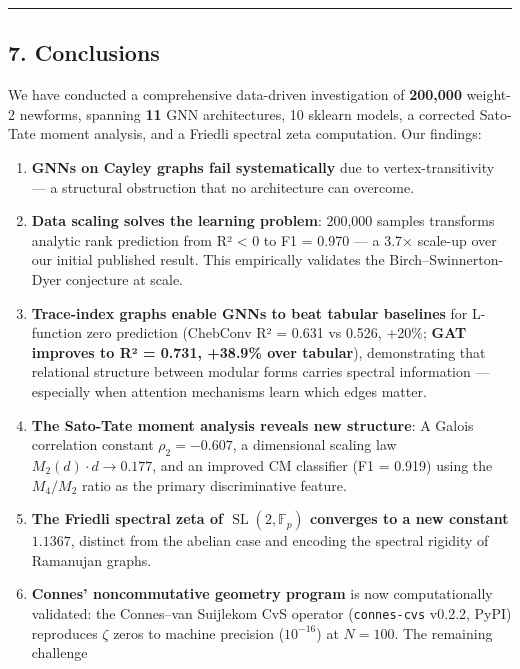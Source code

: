 \documentclass[
]{article}
\begin{document}
\begin{center}\rule{0.5\linewidth}{0.5pt}\end{center}

\hypertarget{conclusions}{%
\subsection{7. Conclusions}\label{conclusions}}

We have conducted a comprehensive data-driven investigation of
\textbf{200,000} weight-2 newforms, spanning \textbf{11} GNN
architectures, 10 sklearn models, a corrected Sato-Tate moment analysis,
and a Friedli spectral zeta computation. Our findings:

\begin{enumerate}
\def\labelenumi{\arabic{enumi}.}
\item
  \textbf{GNNs on Cayley graphs fail systematically} due to
  vertex-transitivity --- a structural obstruction that no architecture
  can overcome.
\item
  \textbf{Data scaling solves the learning problem}: 200,000 samples
  transforms analytic rank prediction from R² \textless{} 0 to F1 =
  0.970 --- a 3.7× scale-up over our initial published result. This
  empirically validates the Birch--Swinnerton-Dyer conjecture at scale.
\item
  \textbf{Trace-index graphs enable GNNs to beat tabular baselines} for
  L-function zero prediction (ChebConv R² = 0.631 vs 0.526, +20\%;
  \textbf{GAT improves to R² = 0.731, +38.9\% over tabular}),
  demonstrating that relational structure between modular forms carries
  spectral information --- especially when attention mechanisms learn
  which edges matter.
\item
  \textbf{The Sato-Tate moment analysis reveals new structure}: A Galois
  correlation constant \(\rho_2 = -0.607\), a dimensional scaling law
  \(M_2(d) \cdot d \to 0.177\), and an improved CM classifier (F1 =
  0.919) using the \(M_4/M_2\) ratio as the primary discriminative
  feature.
\item
  \textbf{The Friedli spectral zeta of
  \(\operatorname{SL}(2,\mathbb{F}_p)\) converges to a new constant}
  \(1.1367\), distinct from the abelian case and encoding the spectral
  rigidity of Ramanujan graphs.
\item
  \textbf{Connes' noncommutative geometry program} is now
  computationally validated: the Connes--van Suijlekom CvS operator
  (\texttt{connes-cvs} v0.2.2, PyPI) reproduces \(\zeta\) zeros to
  machine precision (\(10^{-16}\)) at \(N=100\). The remaining challenge

\end{enumerate}
\end{document}
